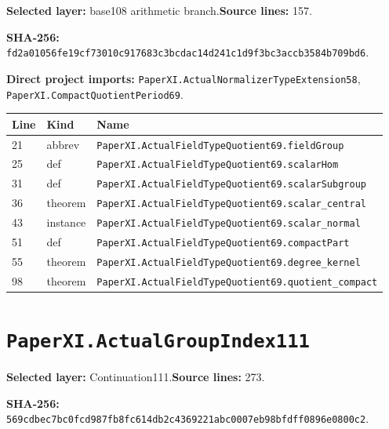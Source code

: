 \documentclass[10pt,oneside]{book}
\begin{document}
\textbf{Selected layer:} base108 arithmetic branch.\quad\textbf{Source lines:} 157.\par\textbf{SHA-256:} {\scriptsize\nolinkurl{fd2a01056fe19cf73010c917683c3bcdac14d241c1d9f3bc3accb3584b709bd6}}.


\textbf{Direct project imports:} \nolinkurl{PaperXI.ActualNormalizerTypeExtension58}, \nolinkurl{PaperXI.CompactQuotientPeriod69}.

\begin{longtable}{@{}p{}p{}p{}@{}}\toprule Line&Kind&Name\\\midrule\endhead

21&abbrev&\nolinkurl{PaperXI.ActualFieldTypeQuotient69.fieldGroup}\\

25&def&\nolinkurl{PaperXI.ActualFieldTypeQuotient69.scalarHom}\\

31&def&\nolinkurl{PaperXI.ActualFieldTypeQuotient69.scalarSubgroup}\\

36&theorem&\nolinkurl{PaperXI.ActualFieldTypeQuotient69.scalar_central}\\

43&instance&\nolinkurl{PaperXI.ActualFieldTypeQuotient69.scalar_normal}\\

51&def&\nolinkurl{PaperXI.ActualFieldTypeQuotient69.compactPart}\\

55&theorem&\nolinkurl{PaperXI.ActualFieldTypeQuotient69.degree_kernel}\\

98&theorem&\nolinkurl{PaperXI.ActualFieldTypeQuotient69.quotient_compact}\\

\bottomrule\end{longtable}

\section{\texorpdfstring{\nolinkurl{PaperXI.ActualGroupIndex111}}{PaperXI.ActualGroupIndex111}}\label{module:PaperXI.ActualGroupIndex111}

\textbf{Selected layer:} Continuation111.\quad\textbf{Source lines:} 273.\par\textbf{SHA-256:} {\scriptsize\nolinkurl{569cdbec7bc0fcd987fb8fc614db2c4369221abc0007eb98bfdff0896e0800c2}}.
\end{document}
